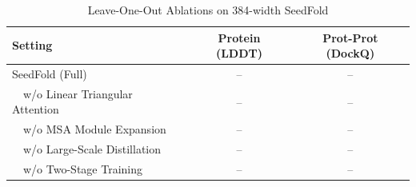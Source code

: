 \begin{table}[h]
\centering
\caption{Leave-One-Out Ablations on 384-width SeedFold}
\label{tab:leave-one-out_ablation}
\begin{tabular}{l cc}
\toprule
\textbf{Setting} & \textbf{Protein (LDDT)} & \textbf{Prot-Prot (DockQ)}\\
\midrule
SeedFold (Full) & -- & -- \\
\midrule
\ \ w/o Linear Triangular Attention & -- & -- \\
\ \ w/o MSA Module Expansion & -- & -- \\
\ \ w/o Large-Scale Distillation & -- & -- \\
\ \ w/o Two-Stage Training & -- & -- \\
\bottomrule
\end{tabular}%
\end{table}
